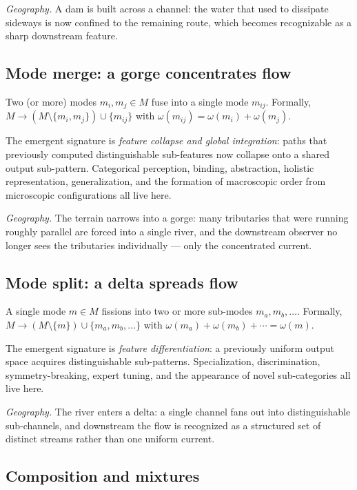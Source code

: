 \documentclass[11pt,a4paper]{article}
\begin{document}
\textit{Geography.} A dam is built across a channel: the water that
used to dissipate sideways is now confined to the remaining route,
which becomes recognizable as a sharp downstream feature.

\subsection{Mode merge: a gorge concentrates flow}

Two (or more) modes $m_i, m_j \in M$ fuse into a single mode
$m_{ij}$. Formally, $M \to (M\setminus\{m_i,m_j\})\cup\{m_{ij}\}$
with $\omega(m_{ij}) = \omega(m_i)+\omega(m_j)$.

The emergent signature is \emph{feature collapse and global
integration}: paths that previously computed distinguishable
sub-features now collapse onto a shared output sub-pattern.
Categorical perception, binding, abstraction, holistic
representation, generalization, and the formation of macroscopic
order from microscopic configurations all live here.

\textit{Geography.} The terrain narrows into a gorge: many tributaries
that were running roughly parallel are forced into a single river,
and the downstream observer no longer sees the tributaries
individually --- only the concentrated current.

\subsection{Mode split: a delta spreads flow}

A single mode $m\in M$ fissions into two or more sub-modes
$m_a, m_b, \dots$. Formally, $M \to (M\setminus\{m\})\cup\{m_a,m_b,\dots\}$
with $\omega(m_a)+\omega(m_b)+\cdots = \omega(m)$.

The emergent signature is \emph{feature differentiation}: a
previously uniform output space acquires distinguishable
sub-patterns. Specialization, discrimination, symmetry-breaking,
expert tuning, and the appearance of novel sub-categories all live
here.

\textit{Geography.} The river enters a delta: a single channel
fans out into distinguishable sub-channels, and downstream the
flow is recognized as a structured set of distinct streams rather
than one uniform current.

\subsection{Composition and mixtures}
\end{document}
